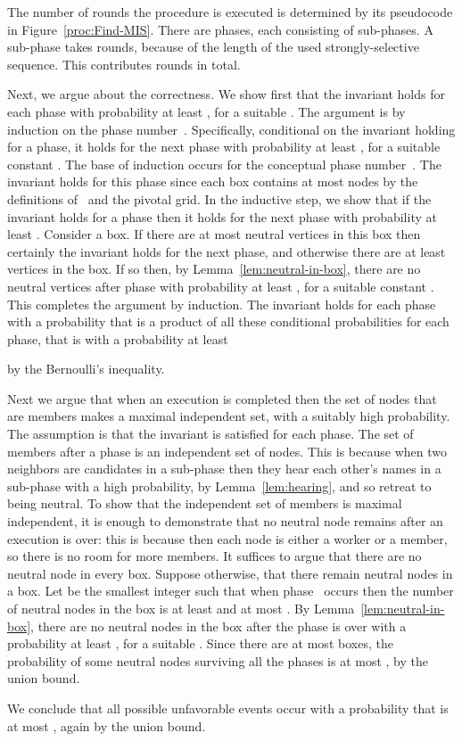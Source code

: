 \documentclass[11pt]{article}
\newcommand{\qed}{\hfill  \smallskip}
\newenvironment{proof}{\noindent{\bf Proof:}}{\qed}
\begin{document}
\begin{proof} 
The number of rounds the procedure is executed is determined by its pseudocode in Figure~\ref{proc:Find-MIS}.
There are  phases, each consisting of  sub-phases.
A sub-phase takes  rounds, because of the length of the used strongly-selective sequence.
This contributes  rounds in total.

Next, we argue about the correctness.
We show first that the invariant holds for each phase with probability at least , for a suitable .
The argument is by induction on the phase number~.
Specifically, conditional on the invariant holding for a phase, it holds for the next phase with probability at least , for a suitable constant .
The base of induction occurs for the conceptual phase number~.
The invariant holds for this phase since each box contains at most  nodes by the definitions of~ and the pivotal grid.
In the inductive step, we show that if the invariant holds for a phase  then it holds for the next phase  with probability at least .
Consider a box.
If there are at most    neutral vertices in this box then certainly the invariant holds for the next phase, and otherwise there are at least    vertices in the box. 
If so then, by Lemma~\ref{lem:neutral-in-box}, there are no neutral vertices after phase  with probability at least , for a suitable constant .
This completes the argument by induction.
The invariant holds for each phase with a probability that is a product of all these conditional probabilities for each phase, that is with a probability at least

by the Bernoulli's inequality.

Next we argue that when an execution is completed then the set of nodes that are members makes a maximal independent set, with a suitably high probability.
The assumption is that the invariant is satisfied for each phase.
The set of members after a phase is an independent set of nodes.
This is because when two neighbors are candidates in a sub-phase then they hear each other's names in a sub-phase with a high probability, by Lemma~\ref{lem:hearing}, and so retreat to being neutral.
To show that the independent set of members is maximal independent, it is enough to demonstrate that no neutral node remains after an execution is over: this is because then each node is either a worker or a member, so there is no room for more members.
It suffices to argue that there are no neutral node in every box.
Suppose otherwise, that there remain neutral nodes in a box.
Let  be the smallest integer such that when phase~ occurs then the number of neutral nodes in the box is at least    and at most .
By Lemma~\ref{lem:neutral-in-box}, there are no neutral nodes in the box after the phase is over with a probability at least , for a suitable .
Since there are at most  boxes, the probability of some neutral nodes surviving all the phases is at most , by the union bound.

We conclude that all possible unfavorable events occur with a probability that is at most , again by the union bound.
\end{proof} 
\end{document}
